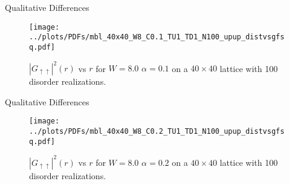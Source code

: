 \documentclass[]{beamer}
\begin{document}
\begin{frame}{Qualitative Differences}
    \begin{figure}
        \centering
        \texttt{[image: ../plots/PDFs/mbl\_40x40\_W8\_C0.1\_TU1\_TD1\_N100\_upup\_distvsgfsq.pdf]}
        \caption{$|G_{\uparrow\uparrow}|^2(r)$ vs $r$ for $W = 8.0$ $\alpha = 0.1$ on a $40\times40$
                lattice with 100 disorder realizations.}
    \end{figure}        
\end{frame}

\begin{frame}{Qualitative Differences}
    \begin{figure}
        \centering
        \texttt{[image: ../plots/PDFs/mbl\_40x40\_W8\_C0.2\_TU1\_TD1\_N100\_upup\_distvsgfsq.pdf]}
        \caption{$|G_{\uparrow\uparrow}|^2(r)$ vs $r$ for $W = 8.0$ $\alpha = 0.2$ on a $40\times40$
                lattice with 100 disorder realizations.}
    \end{figure}        
\end{frame}
\end{document}
